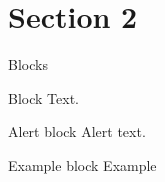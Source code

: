     \section{Section 2}
    \begin{frame}{Blocks}
        \begin{block}{Block}
            Text.
        \end{block}
        \pause
        \begin{alertblock}{Alert block}
            Alert \alert{text}.
        \end{alertblock}
        \pause
        \begin{exampleblock}{Example block}
            Example
        \end{exampleblock}
    \end{frame}
    
